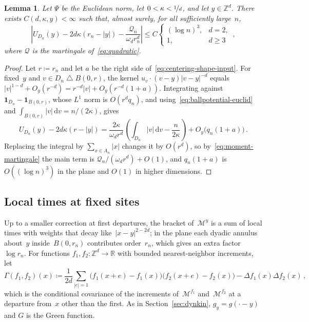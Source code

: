 \documentclass[11pt]{amsart}
\theoremstyle{plain}
\newtheorem{lemma}[theorem]{Lemma}
\theoremstyle{definition}
\newcommand{\Z}{\mathbb Z}
\newcommand{\R}{\mathbb R}
\newcommand{\drift}{\kappa}
\newcommand{\gauge}{\Psi}
\newcommand{\ind}{\mathbf 1}
\newcommand{\dd}{\,\mathrm d}
\newcommand{\nf}{\nicefrac}
\numberwithin{equation}{section}
\begin{document}
\begin{lemma}\label{lem:fixed-site-centering}
Let $\gauge$ be the Euclidean norm, let $0<\drift<\nf1d$, and let $y\in\Z^d$. There exists $C(d,\drift,y)<\infty$ such that, almost surely, for all sufficiently large~$n$,
\begin{equation}\label{eq:fixed-site-centering}
\left|U_{D_n}(y)-2d\drift(r_n-|y|)-\frac{\mathcal Q_n}{\omega_dr_n^d}\right|\leq C\begin{cases}(\log n)^3,&d=2,\\1,&d\geq3\end{cases}\, ,
\end{equation}
where $\mathcal Q$ is the martingale of~\eqref{eq:quadratic}.
\end{lemma}

\begin{proof}
Let $r\coloneqq r_n$ and let $a$ be the right side of~\eqref{eq:centering-shape-input}. For fixed~$y$ and $v\in D_n\mathbin{\triangle}B(0,r)$, the kernel $u_v\cdot(v-y)|v-y|^{-d}$ equals $|v|^{1-d}+O_y(r^{-d})=r^{-d}|v|+O_y(r^{-d}(1+a))$. Integrating against $\ind_{D_n}-\ind_{B(0,r)}$, whose $L^1$ norm is $O(r^dq_n)$, and using~\eqref{eq:ballpotential-euclid} and $\int_{B(0,r)}|v|\dd v=n/(2\drift)$, gives
\begin{equation*}
U_{D_n}(y)-2d\drift(r-|y|)
=\frac{2\drift}{\omega_dr^d}
\left(\int_{D_n}|v|\dd v-\frac n{2\drift}\right)
+O_y\bigl(q_n(1+a)\bigr)\, .
\end{equation*}
Replacing the integral by $\sum_{x\in A_n}|x|$ changes it by $O(r^d)$, so by~\eqref{eq:moment-martingale} the main term is $\mathcal Q_n/(\omega_dr^d)+O(1)$, and $q_n(1+a)$ is $O((\log n)^3)$ in the plane and $O(1)$ in higher dimensions.
\end{proof}

\subsection{Local times at fixed sites}

Up to a smaller correction at first departures, the bracket of~$\mathcal M^y$ is a sum of local times with weights that decay like~$|x-y|^{2-2d}$; in the plane each dyadic annulus about~$y$ inside~$B(0,r_n)$ contributes order~$r_n$, which gives an extra factor~$\log r_n$. For functions $f_1,f_2\colon\Z^d\to\R$ with bounded nearest-neighbor increments, let
\begin{equation}\label{eq:site-gamma}
\Gamma(f_1,f_2)(x)\coloneqq\frac1{2d}\sum_{|e|=1}\bigl(f_1(x+e)-f_1(x)\bigr)\bigl(f_2(x+e)-f_2(x)\bigr)-\Delta f_1(x)\Delta f_2(x)\, ,
\end{equation}
which is the conditional covariance of the increments of~$\mathcal M^{f_1}$ and~$\mathcal M^{f_2}$ at a departure from~$x$ other than the first. As in Section~\ref{sec:dynkin}, $g_y=g(\cdot-y)$ and $G$ is the Green function.
\end{document}
